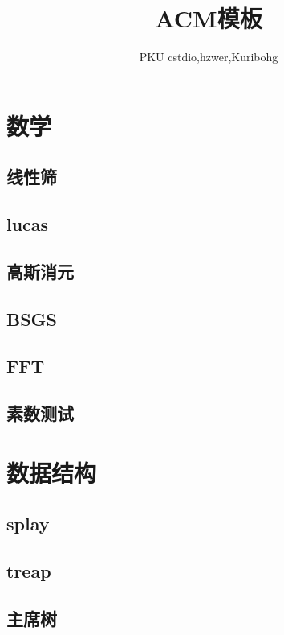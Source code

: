\documentclass[UTF8,a4paper]{ctexart}
\author{PKU cstdio,hzwer,Kuribohg}
\title{\Huge ACM模板}
\begin{document}
 
\maketitle
\tableofcontents
\section{数学}

\subsection{线性筛}

\subsection{lucas}

\subsection{高斯消元}

\subsection{BSGS}

\subsection{FFT}

\subsection{素数测试}

\section{数据结构}

\subsection{splay}

\subsection{treap}

\subsection{主席树}
\end{document}
